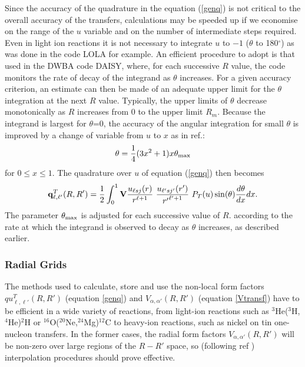 \documentclass[11pt,a4paper]{article}
\newcommand{\half}{\frac{1}{2}}
\begin{document}
Since the accuracy of the quadrature in the equation (\ref{genq}) is not critical
to the overall accuracy of the transfers, calculations may be speeded up if we
economise on the range of the $u$ variable and on the
number of intermediate steps required.
Even in light ion reactions it is not necessary to integrate $u$ to $-1$
($\theta$ to 180$^\circ$) as was done in the code LOLA
\cite{LOLA}
for example.  An efficient procedure to adopt is that used in the DWBA
code DAISY\cite{DAISY}, where, for each successive $R$ value, the code monitors the rate
of decay of the integrand as $\theta$ increases.  For a given accuracy
criterion, an estimate can then be made of an adequate upper limit
for the $\theta$ integration at the next $R$ value.  Typically, the upper
limits of $\theta$ decrease monotonically as $R$ increases from 0 to the
upper limit $R_m$.
Because the integrand is largest for $\theta$=0, the accuracy of the angular
integration for small $\theta$ is improved by a change of variable from $u$
to $x$ as in ref.\cite{DAISY}:
\begin{eqnarray}
 \theta = \frac{1}{4} (3 x^2 + 1) x \theta_{\rm max}
\end{eqnarray}
for $0 \leq x \leq 1. $  The quadrature over $u$ of equation (\ref{genq}) then becomes
\begin{eqnarray}
 {\bf q}^T_ {\ell , \ell'} (R,R')
 =
   \half \int_ 0 ^ 1
         {\bf V} {u_{\ell sj} (r)\over r^{\ell + 1}} ~
               {u_{\ell' sj'} (r')\over {r'}^{\ell' +1}} ~
              P_T (u) \sin(\theta) {d \theta \over dx} dx.
\end{eqnarray}
The parameter $\theta_{\rm max}$ is adjusted for each successive
value of $R$. according to the rate at which the integrand is observed to decay
as $\theta$ increases, as described earlier.
\subsubsection{Radial Grids}

The methods used to calculate, store and use the non-local form factors
$ qu^T_{\ell , \ell'} (R,R') $ (equation \ref{genq}) and
$V_{\alpha ,\alpha'} (R,R') $ (equation \ref{Vtransf})
have to be efficient in a wide variety of reactions, from light-ion
reactions such as
$^3$He($^3$H,$^4$He)$^2$H or $^{16}$O($^{20}$Ne,$^{24}$Mg)$^{12}$C
to heavy-ion reactions, such as nickel on tin one-nucleon transfers.
In the former cases, the radial form factors
$V_{\alpha ,\alpha'} (R,R') $
will be non-zero over large regions of the $R-R'$ space, so
(following ref \cite{SM1}) interpolation procedures should prove effective.
\end{document}
